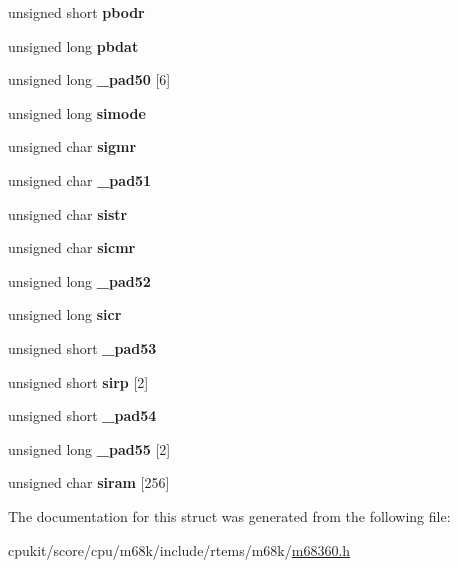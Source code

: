 \begin{DoxyCompactItemize}
unsigned short {\bfseries pbodr}
\item 
\mbox{\label{structm360___a822d50c7920e4e01869d21d9b3ed4417}} 
unsigned long {\bfseries pbdat}
\item 
\mbox{\label{structm360___a72617ba2a7b6dbebafc8d441c4907ee3}} 
unsigned long {\bfseries \+\_\+pad50} \mbox{[}6\mbox{]}
\item 
\mbox{\label{structm360___a690f237687b3c11f24ba9eb14170353c}} 
unsigned long {\bfseries simode}
\item 
\mbox{\label{structm360___a023828a0ff24ca9cc438eb1a7df9a36b}} 
unsigned char {\bfseries sigmr}
\item 
\mbox{\label{structm360___aff5ed88ebd1d7857d3b26f9c45c06c7a}} 
unsigned char {\bfseries \+\_\+pad51}
\item 
\mbox{\label{structm360___af62a56f7820a841fbf0a78b9e4290639}} 
unsigned char {\bfseries sistr}
\item 
\mbox{\label{structm360___a2e0434bb3e23b3854d6ab942ce72962e}} 
unsigned char {\bfseries sicmr}
\item 
\mbox{\label{structm360___a45b356c38f99357b28b3517559702302}} 
unsigned long {\bfseries \+\_\+pad52}
\item 
\mbox{\label{structm360___ac5679bb6b924d35f1d179c140cadabb6}} 
unsigned long {\bfseries sicr}
\item 
\mbox{\label{structm360___ab14d08c2bc1996ec4a2a0b022d531de7}} 
unsigned short {\bfseries \+\_\+pad53}
\item 
\mbox{\label{structm360___ac9d1fc6974843c98b55136797896c4a4}} 
unsigned short {\bfseries sirp} \mbox{[}2\mbox{]}
\item 
\mbox{\label{structm360___a77fd1e301ccab72d67559e71860a9365}} 
unsigned short {\bfseries \+\_\+pad54}
\item 
\mbox{\label{structm360___a38628ed8f48fba8f153cc8c4278b30e4}} 
unsigned long {\bfseries \+\_\+pad55} \mbox{[}2\mbox{]}
\item 
\mbox{\label{structm360___a4b974d785d29739a8870b57e85f0067b}} 
unsigned char {\bfseries siram} \mbox{[}256\mbox{]}
\end{DoxyCompactItemize}


The documentation for this struct was generated from the following file\+:\begin{DoxyCompactItemize}
\item 
cpukit/score/cpu/m68k/include/rtems/m68k/\mbox{\hyperlink{m68360_8h}{m68360.\+h}}\end{DoxyCompactItemize}
